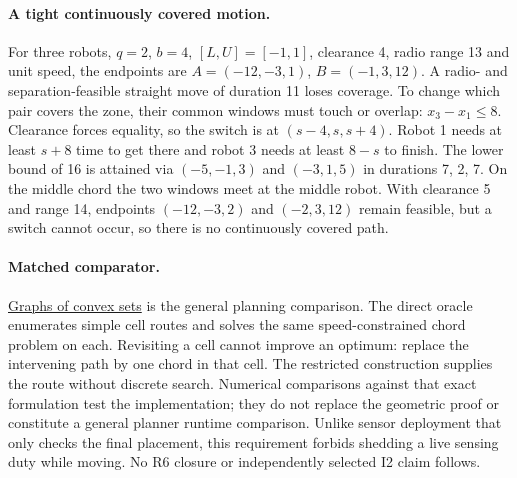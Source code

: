 \documentclass{article}
\begin{document}
\paragraph{A tight continuously covered motion.}
For three robots, $q=2$, $b=4$, $[L,U]=[-1,1]$, clearance 4,
radio range 13 and unit speed, the endpoints are
$A=(-12,-3,1)$, $B=(-1,3,12)$. A radio- and separation-feasible
straight move of duration 11 loses coverage. To change which pair
covers the zone, their common windows must touch or overlap:
$x_3-x_1\le8$. Clearance forces equality, so the switch is at
$(s-4,s,s+4)$. Robot 1 needs at least $s+8$ time to get there and
robot 3 needs at least $8-s$ to finish. The lower bound of 16 is
attained via $(-5,-1,3)$ and $(-3,1,5)$ in durations 7, 2, 7.
On the middle chord the two windows meet at the middle robot.
With clearance 5 and range 14, endpoints
$(-12,-3,2)$ and $(-2,3,12)$ remain feasible, but a switch
cannot occur, so there is no continuously covered path.

\paragraph{Matched comparator.}
\href{https://arxiv.org/abs/2205.04422}{Graphs of convex sets}
is the general planning comparison. The direct oracle enumerates
simple cell routes and solves the same speed-constrained chord
problem on each. Revisiting a cell cannot improve an optimum:
replace the intervening path by one chord in that cell.
The restricted construction supplies the route without discrete
search. Numerical comparisons against that exact formulation
test the implementation; they do not replace the geometric proof
or constitute a general planner runtime comparison.
Unlike sensor deployment that only checks the final placement,
this requirement forbids shedding a live sensing duty while
moving. No R6 closure or independently selected I2 claim follows.
\end{document}
